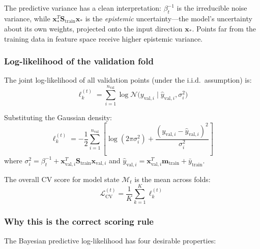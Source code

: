 \documentclass[11pt,a4paper]{article}
\begin{document}
The predictive variance has a clean interpretation: $\beta_t^{-1}$ is the irreducible noise variance, while $\mathbf{x}_*^T \mathbf{S}_{\text{train}} \mathbf{x}_*$ is the \emph{epistemic} uncertainty---the model's uncertainty about its own weights, projected onto the input direction $\mathbf{x}_*$. Points far from the training data in feature space receive higher epistemic variance.

\subsubsection*{Log-likelihood of the validation fold}

The joint log-likelihood of all validation points (under the i.i.d.\ assumption) is:
\begin{equation}
\ell_k^{(t)} = \sum_{i=1}^{n_{\text{val}}} \log \mathcal{N}\bigl(y_{\text{val},i} \mid \hat{y}_{\text{val},i}, \sigma_i^2\bigr)
\label{eq:ll_sum}
\end{equation}

Substituting the Gaussian density:
\begin{equation}
\boxed{\ell_k^{(t)} = -\frac{1}{2}\sum_{i=1}^{n_{\text{val}}} \left[ \log(2\pi\sigma_i^2) + \frac{(y_{\text{val},i} - \hat{y}_{\text{val},i})^2}{\sigma_i^2} \right]}
\label{eq:ll_final}
\end{equation}
where $\sigma_i^2 = \beta_t^{-1} + \mathbf{x}_{\text{val},i}^T \mathbf{S}_{\text{train}} \mathbf{x}_{\text{val},i}$ and $\hat{y}_{\text{val},i} = \mathbf{x}_{\text{val},i}^T \mathbf{m}_{\text{train}} + \bar{y}_{\text{train}}$.

The overall CV score for model state $\mathcal{M}_t$ is the mean across folds:
\begin{equation}
\mathcal{L}_{\text{CV}}^{(t)} = \frac{1}{K} \sum_{k=1}^{K} \ell_k^{(t)}
\label{eq:cv_mean}
\end{equation}

\subsubsection*{Why this is the correct scoring rule}

The Bayesian predictive log-likelihood has four desirable properties:
\end{document}
